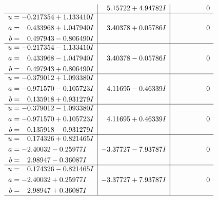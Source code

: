 \documentclass[1p]{elsarticle_modified}
\theoremstyle{definition}
\begin{document}
$$\begin{array}{c|c|c}
 & \phantom{-}5.15722 + 4.94782 I & \phantom{-0.000000 } 0 \\ \hline\begin{aligned}
u &= -0.217354 + 1.133410 I \\
a &= \phantom{-}0.433968 + 1.047940 I \\
b &= \phantom{-}0.497943 - 0.806490 I\end{aligned}
 & \phantom{-}3.40378 + 0.05786 I & \phantom{-0.000000 } 0 \\ \hline\begin{aligned}
u &= -0.217354 - 1.133410 I \\
a &= \phantom{-}0.433968 - 1.047940 I \\
b &= \phantom{-}0.497943 + 0.806490 I\end{aligned}
 & \phantom{-}3.40378 - 0.05786 I & \phantom{-0.000000 } 0 \\ \hline\begin{aligned}
u &= -0.379012 + 1.093380 I \\
a &= -0.971570 - 0.105723 I \\
b &= \phantom{-}0.135918 + 0.931279 I\end{aligned}
 & \phantom{-}4.11695 - 0.46339 I & \phantom{-0.000000 } 0 \\ \hline\begin{aligned}
u &= -0.379012 - 1.093380 I \\
a &= -0.971570 + 0.105723 I \\
b &= \phantom{-}0.135918 - 0.931279 I\end{aligned}
 & \phantom{-}4.11695 + 0.46339 I & \phantom{-0.000000 } 0 \\ \hline\begin{aligned}
u &= \phantom{-}0.174326 + 0.821465 I \\
a &= -2.40032 - 0.25977 I \\
b &= \phantom{-}2.98947 - 0.36087 I\end{aligned}
 & -3.37727 - 7.93787 I & \phantom{-0.000000 } 0 \\ \hline\begin{aligned}
u &= \phantom{-}0.174326 - 0.821465 I \\
a &= -2.40032 + 0.25977 I \\
b &= \phantom{-}2.98947 + 0.36087 I\end{aligned}
 & -3.37727 + 7.93787 I & \phantom{-0.000000 } 0\\
 \hline 
 \end{array}$$\newpage$$\begin{array}{c|c|c}  

\end{array}$$
\end{document}
